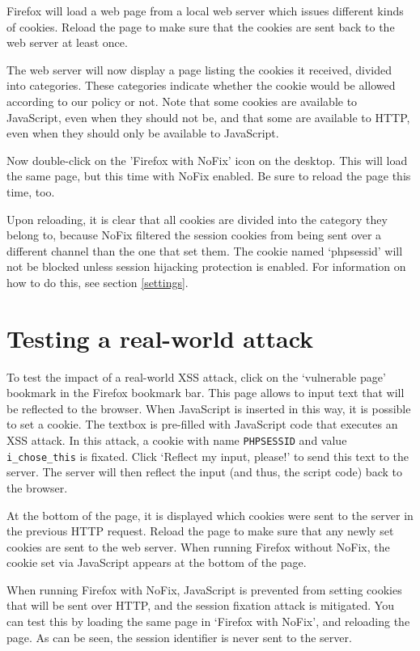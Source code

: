 Firefox will load a web page from a local web server which issues different kinds of cookies. Reload the page to make sure that the cookies are sent back to the web server at least once.

The web server will now display a page listing the cookies it received, divided into categories. These categories indicate whether the cookie would be allowed according to our policy or not. Note that some cookies are available to JavaScript, even when they should not be, and that some are available to HTTP, even when they should only be available to JavaScript.

Now double-click on the 'Firefox with NoFix' icon on the desktop. This will load the same page, but this time with NoFix enabled. Be sure to reload the page this time, too.

Upon reloading, it is clear that all cookies are divided into the category they belong to, because NoFix filtered the session cookies from being sent over a different channel than the one that set them. The cookie named `phpsessid' will not be blocked unless session hijacking protection is enabled. For information on how to do this, see section \ref{settings}.

\section{Testing a real-world attack}

To test the impact of a real-world XSS attack, click on the `vulnerable page' bookmark in the Firefox bookmark bar. This page allows to input text that will be reflected to the browser. When JavaScript is inserted in this way, it is possible to set a cookie. The textbox is pre-filled with JavaScript code that executes an XSS attack. In this attack, a cookie with name \texttt{PHPSESSID} and value \texttt{i\_chose\_this} is fixated. Click `Reflect my input, please!' to send this text to the server. The server will then reflect the input (and thus, the script code) back to the browser.

At the bottom of the page, it is displayed which cookies were sent to the server in the previous HTTP request. Reload the page to make sure that any newly set cookies are sent to the web server. When running Firefox without NoFix, the cookie set via JavaScript appears at the bottom of the page.

When running Firefox with NoFix, JavaScript is prevented from setting cookies that will be sent over HTTP, and the session fixation attack is mitigated. You can test this by loading the same page in `Firefox with NoFix', and reloading the page. As can be seen, the session identifier is never sent to the server.

